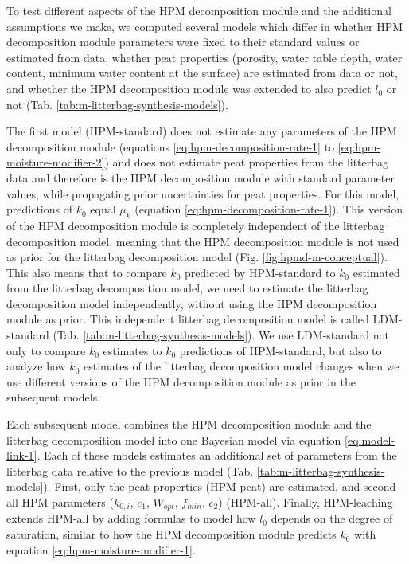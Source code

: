 \documentclass[esd, manuscript]{copernicus}
\begin{document}
To test different aspects of the HPM decomposition module and the additional assumptions we make, we computed several models which differ in whether HPM decomposition module parameters were fixed to their standard values or estimated from data, whether peat properties (porosity, water table depth, water content, minimum water content at the surface) are estimated from data or not, and whether the HPM decomposition module was extended to also predict \(l_0\) or not (Tab. \ref{tab:m-litterbag-synthesis-models}).

The first model (HPM-standard) does not estimate any parameters of the HPM decomposition module (equations \eqref{eq:hpm-decomposition-rate-1} to \eqref{eq:hpm-moisture-modifier-2}) and does not estimate peat properties from the litterbag data and therefore is the HPM decomposition module with standard parameter values, while propagating prior uncertainties for peat properties. For this model, predictions of \(k_0\) equal \(\mu_k\) (equation \eqref{eq:hpm-decomposition-rate-1}). This version of the HPM decomposition module is completely independent of the litterbag decomposition model, meaning that the HPM decomposition module is not used as prior for the litterbag decomposition model (Fig. \ref{fig:hpmd-m-conceptual}). This also means that to compare \(k_0\) predicted by HPM-standard to \(k_0\) estimated from the litterbag decomposition model, we need to estimate the litterbag decomposition model independently, without using the HPM decomposition module as prior. This independent litterbag decomposition model is called LDM-standard (Tab. \ref{tab:m-litterbag-synthesis-models}). We use LDM-standard not only to compare \(k_0\) estimates to \(k_0\) predictions of HPM-standard, but also to analyze how \(k_0\) estimates of the litterbag decomposition model changes when we use different versions of the HPM decomposition module as prior in the subsequent models.

Each subsequent model combines the HPM decomposition module and the litterbag decomposition model into one Bayesian model via equation \eqref{eq:model-link-1}. Each of these models estimates an additional set of parameters from the litterbag data relative to the previous model (Tab. \ref{tab:m-litterbag-synthesis-models}). First, only the peat properties (HPM-peat) are estimated, and second all HPM parameters (\(k_{0,i}\), \(c_1\), \(W_{opt}\), \(f_{min}\), \(c_2\)) (HPM-all). Finally, HPM-leaching extends HPM-all by adding formulas to model how \(l_0\) depends on the degree of saturation, similar to how the HPM decomposition module predicts \(k_0\) with equation \eqref{eq:hpm-moisture-modifier-1}.
\end{document}
